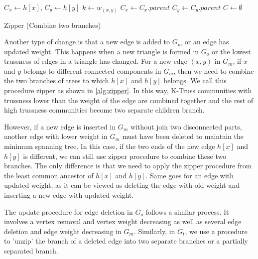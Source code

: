 \begin{algorithm}
	\BlankLine
	$C_x \gets h[x]$, $C_y \gets h[y]$\;
	$k \gets w_{(x,y)}$\;
	 {
		$C_x \gets C_{x}.parent$
	}
	 {
		$C_y \gets C_{y}.parent$
	}
	$C \gets \emptyset$ \;
	\caption{Zipper (Combine two branches)}\label{alg:zipper}
\end{algorithm}

Another type of change is that a new edge is added to $G_m$ or an edge has updated weight. This happens when a new triangle is formed in $G_o$ or the lowest trussness of edges in a triangle has changed. For a new edge $(x,y)$ in $G_m$, if $x$ and $y$ belongs to different connected components in $G_m$, then we need to combine the two branches of trees to which $h[x]$ and $h[y]$ belongs. We call this procedure zipper as shown in \autoref{alg:zipper}. In this way, K-Truss communities with trussness lower than the weight of the edge are combined together and the rest of high trussness communities become two separate children branch. 

However, if a new edge is inserted in $G_m$ without join two disconnected parts, another edge with lower weight in $G_m$ must have been deleted to maintain the minimum spanning tree. In this case, if the two ends of the new edge $h[x]$ and $h[y]$ is different, we can still use zipper procedure to combine these two branches. The only difference is that we need to apply the zipper procedure from the least common ancestor of $h[x]$ and $h[y]$. Same goes for an edge with updated weight, as it can be viewed as deleting the edge with old weight and inserting a new edge with updated weight.

The update procedure for edge deletion in $G_o$ follows a similar process. It involves a vertex removal and vertex weight decreasing as well as several edge deletion and edge weight decreasing in $G_m$. Similarly, in $G_t$, we use a procedure to 'unzip' the branch of a deleted edge into two separate branches or a partially separated branch.

